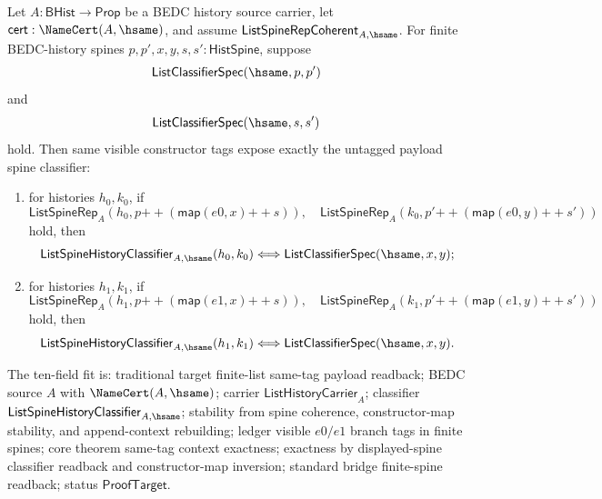 \begin{theorem}
\label{thm:list-represented-spine-same-tag-context-exactness}
Let $A:\mathsf{BHist}\to\mathsf{Prop}$ be a BEDC history source carrier, let
$\mathsf{cert}:\NameCert(A,\hsame)$, and assume
$\mathsf{ListSpineRepCoherent}_{A,\hsame}$. For finite BEDC-history spines
$p,p',x,y,s,s':\mathsf{HistSpine}$, suppose
$$
\mathsf{ListClassifierSpec}(\hsame,p,p')
$$
and
$$
\mathsf{ListClassifierSpec}(\hsame,s,s')
$$
hold. Then same visible constructor tags expose exactly the untagged payload
spine classifier:
\begin{enumerate}
  \item for histories $h_0,k_0$, if
  $$
  \mathsf{ListSpineRep}_A(h_0,p{++}(\mathsf{map}(e0,x){++}s)),
  \quad
  \mathsf{ListSpineRep}_A(k_0,p'{++}(\mathsf{map}(e0,y){++}s'))
  $$
  hold, then
  $$
  \mathsf{ListSpineHistoryClassifier}_{A,\hsame}(h_0,k_0)
  \Longleftrightarrow
  \mathsf{ListClassifierSpec}(\hsame,x,y);
  $$
  \item for histories $h_1,k_1$, if
  $$
  \mathsf{ListSpineRep}_A(h_1,p{++}(\mathsf{map}(e1,x){++}s)),
  \quad
  \mathsf{ListSpineRep}_A(k_1,p'{++}(\mathsf{map}(e1,y){++}s'))
  $$
  hold, then
  $$
  \mathsf{ListSpineHistoryClassifier}_{A,\hsame}(h_1,k_1)
  \Longleftrightarrow
  \mathsf{ListClassifierSpec}(\hsame,x,y).
  $$
\end{enumerate}

The ten-field fit is: traditional target finite-list same-tag payload readback;
BEDC source $A$ with $\NameCert(A,\hsame)$; carrier
$\mathsf{ListHistoryCarrier}_A$; classifier
$\mathsf{ListSpineHistoryClassifier}_{A,\hsame}$; stability from spine
coherence, constructor-map stability, and append-context rebuilding; ledger
visible $e0/e1$ branch tags in finite spines; core theorem same-tag context
exactness; exactness by displayed-spine classifier readback and constructor-map
inversion; standard bridge finite-spine readback; status
$\mathsf{ProofTarget}$.
\end{theorem}
